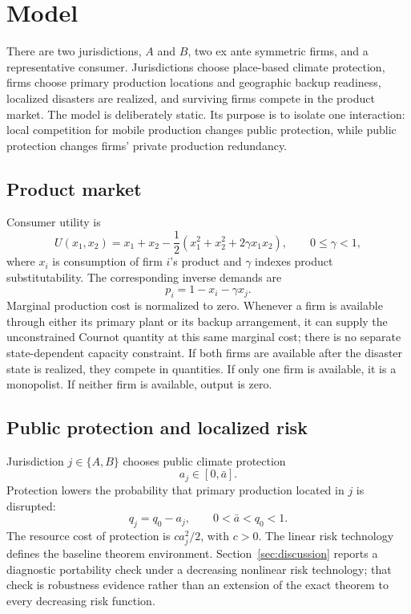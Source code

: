 \section{Model}\label{sec:model}

There are two jurisdictions, $A$ and $B$, two ex ante symmetric firms, and a representative consumer. Jurisdictions choose place-based climate protection, firms choose primary production locations and geographic backup readiness, localized disasters are realized, and surviving firms compete in the product market. The model is deliberately static. Its purpose is to isolate one interaction: local competition for mobile production changes public protection, while public protection changes firms' private production redundancy.

\subsection{Product market}

Consumer utility is
\begin{equation}
U(x_1,x_2)=x_1+x_2-\frac12\left(x_1^2+x_2^2+2\gamma x_1x_2\right),
\qquad 0\leq \gamma<1,
\label{eq:utility}
\end{equation}
where $x_i$ is consumption of firm $i$'s product and $\gamma$ indexes product substitutability. The corresponding inverse demands are
\begin{equation}
p_i=1-x_i-\gamma x_j.
\label{eq:inverse-demand}
\end{equation}
Marginal production cost is normalized to zero. Whenever a firm is available through either its primary plant or its backup arrangement, it can supply the unconstrained Cournot quantity at this same marginal cost; there is no separate state-dependent capacity constraint. If both firms are available after the disaster state is realized, they compete in quantities. If only one firm is available, it is a monopolist. If neither firm is available, output is zero.

\subsection{Public protection and localized risk}

Jurisdiction $j\in\{A,B\}$ chooses public climate protection
\begin{equation}
a_j\in[0,\bar a].
\end{equation}
Protection lowers the probability that primary production located in $j$ is disrupted:
\begin{equation}
q_j=q_0-a_j,
\qquad 0<\bar a<q_0<1.
\label{eq:risk}
\end{equation}
The resource cost of protection is $c a_j^2/2$, with $c>0$. The linear risk technology defines the baseline theorem environment. Section~\ref{sec:discussion} reports a diagnostic portability check under a decreasing nonlinear risk technology; that check is robustness evidence rather than an extension of the exact theorem to every decreasing risk function.

